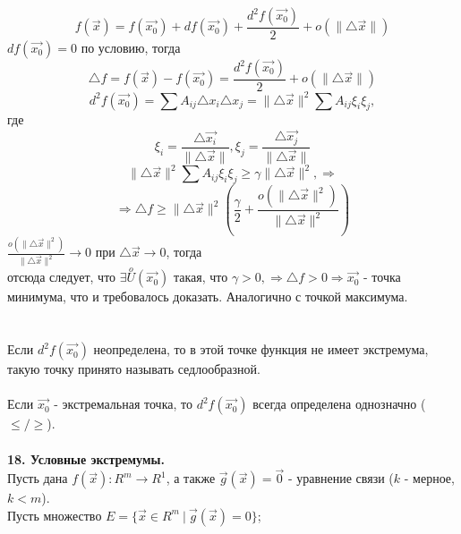 \documentclass[12pt]{article}
\begin{document}
$$f(\overrightarrow{x})=f(\overrightarrow{x_0})+df(\overrightarrow{x_0})+\frac{d^2f(\overrightarrow{x_0})}{2}+o(\| {\bigtriangleup \overrightarrow{x}} \|)$$
$df(\overrightarrow{x_0}) = 0$ по условию, тогда\\
$${\bigtriangleup f} = f(\overrightarrow{x})-f(\overrightarrow{x_0})=\frac{d^2f(\overrightarrow{x_0})}{2}+o(\| {\bigtriangleup \overrightarrow{x}} \|)$$
$$d^2f(\overrightarrow{x_0})=\sum A_{ij} {\bigtriangleup x_i}{\bigtriangleup x_j}=\| {\bigtriangleup \overrightarrow{x}} \|^2 \sum A_{ij} \xi_i \xi_j,$$
где $$\xi_i = \frac{{\bigtriangleup \overrightarrow{x_i}}}{\| {\bigtriangleup \overrightarrow{x}} \|}, \xi_j = \frac{{\bigtriangleup \overrightarrow{x_j}}}{\| {\bigtriangleup \overrightarrow{x}} \|}$$
$$\| {\bigtriangleup \overrightarrow{x}} \|^2 \sum A_{ij} \xi_i \xi_j \geq \gamma \| {\bigtriangleup \overrightarrow{x}} \|^2, \Rightarrow$$
$$\Rightarrow {\bigtriangleup f} \geq \| {\bigtriangleup \overrightarrow{x}} \|^2 (\frac{\gamma}{2} + \frac{o(\| {\bigtriangleup \overrightarrow{x}} \|^2)}{\| {\bigtriangleup \overrightarrow{x}} \|^2})$$
$\frac{o(\| {\bigtriangleup \overrightarrow{x}} \|^2)}{\| {\bigtriangleup \overrightarrow{x}} \|^2} \to 0$ при ${\bigtriangleup \overrightarrow{x}} \to 0$, тогда\\
отсюда следует, что $\exists \overset{o}{U}(\overrightarrow{x_0})$ такая, что $\gamma > 0, \Rightarrow {\bigtriangleup f} > 0 \Rightarrow \overrightarrow{x_0}$ - точка минимума, что и требовалось доказать. Аналогично с точкой максимума.\\
\\
\\
Если $d^2f(\overrightarrow{x_0})$ неопределена, то в этой точке функция не имеет экстремума, такую точку принято называть седлообразной.\\
\\
Если $\overrightarrow{x_0}$ - экстремальная точка, то $d^2 f(\overrightarrow{x_0})$ всегда определена однозначно ($\leq / \geq$).\\
\\
\label{question18_1}\textbf{18. Условные экстремумы.}\\
Пусть дана $f(\overrightarrow{x}) : R^m\to R^1$, а также $\overrightarrow{g}(\overrightarrow{x}) = \overrightarrow{0}$ - уравнение связи ($k$ - мерное, $k < m$).\\
Пусть множество $E = \{ \overrightarrow{x} \in R^m \ | \ \overrightarrow{g}(\overrightarrow{x}) = 0 \}$;\\
\end{document}
